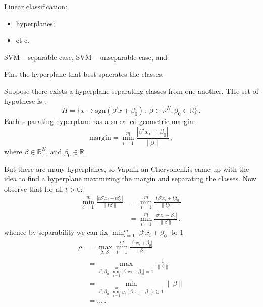 \documentclass[a4paper]{article}
\newcommand{\Real}{\mathbb{R}}
\begin{document}
Linear classification: \begin{itemize}
    \item hyperplanes;
    \item et c.
\end{itemize}

SVM -- separable case, SVM -- unseparable case, and 

Fins the hyperplane that best spaerates the classes.

Suppose there exists a hyperplane separating classes from one another. THe set of hypothese is :
\[ H = \{x\mapsto \text{sgn}(\beta'x + \beta_0) \, : \, \beta\in \Real^N, \beta_0\in \Real\} \,.\]
Each separating hyperplane has a so called geometric margin:
\[\text{margin} = \min_{i=1}^m \frac{|\beta'x_i + \beta_0|}{\|\beta\|} \,,\]
where $\beta\in \Real^N$, and $\beta_0 \in \Real$.

But there are many hyperplanes, so Vapnik an Chervonenkis came up with the idea to
find a hyperplane maximizing the margin and separating the classes. Now observe
that for all $t>0$:
\begin{align*}
    \min_{i=1}^m \frac{|t \beta'x_i + t \beta_0|}{\|t \beta\|}
        &= \min_{i=1}^m \frac{|t \beta'x_i + t \beta_0|}{\|t \beta\|} \\
        &= \min_{i=1}^m \frac{|\beta'x_i + \beta_0|}{\|\beta\|} \,,
\end{align*}
whence by separability we can fix $\min_{i=1}^m |\beta'x_i + \beta_0|$ to $1$
\begin{align*}
    \rho &= \max_{\beta,\beta_0} \min_{i=1}^m \frac{|\beta'x_i + \beta_0|}{\|\beta\|} \\
    &= \max_{\beta, \beta_0, \min_{i=1}^m |\beta'x_i + \beta_0| = 1} \frac{1}{\|\beta\|} \\
    &= \min_{\beta, \beta_0, \min_{i=1}^m y_i(\beta'x_i + \beta_0) \geq 1} \|\beta\| \\
    & = \ldots \,.
\end{align*}
\end{document}
